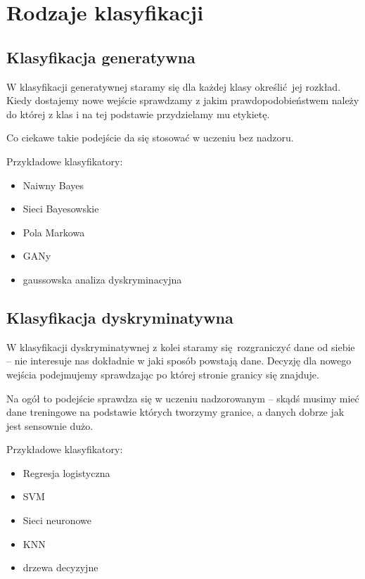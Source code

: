\section{Rodzaje klasyfikacji}

\subsection{Klasyfikacja generatywna}

W klasyfikacji generatywnej staramy się dla każdej klasy określić jej rozkład. Kiedy dostajemy nowe wejście sprawdzamy z jakim prawdopodobieństwem należy do której z klas i na tej podstawie przydzielamy mu etykietę.

Co ciekawe takie podejście da się stosować w uczeniu bez nadzoru.

Przykładowe klasyfikatory:
\begin{itemize}
	\item Naiwny Bayes
	\item Sieci Bayesowskie
	\item Pola Markowa
	\item GANy
	\item gaussowska analiza dyskryminacyjna
\end{itemize}

\subsection{Klasyfikacja dyskryminatywna}

W klasyfikacji dyskryminatywnej z kolei staramy się rozgraniczyć dane od siebie -- nie interesuje nas dokładnie w jaki sposób powstają dane.
Decyzję dla nowego wejścia podejmujemy sprawdzając po której stronie granicy się znajduje.

Na ogół to podejście sprawdza się w uczeniu nadzorowanym -- skądś musimy mieć dane treningowe na podstawie których tworzymy granice, a danych dobrze jak jest sensownie dużo.

Przykładowe klasyfikatory:
\begin{itemize}
	\item Regresja logistyczna
	\item SVM
	\item Sieci neuronowe
	\item KNN
	\item drzewa decyzyjne
\end{itemize}